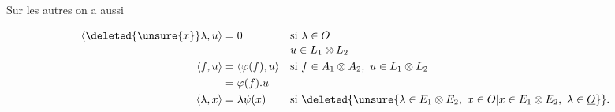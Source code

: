 \quad {}\quad{}

Sur les  autres on a aussi

\[
\begin{aligned}
 \langle\deleted{\unsure{x}}\lambda,u\rangle&=0 &&\text{si }\lambda\in O\\[-2pt]
 &&&u\in L_1\otimes L_2\\
 \langle f,u\rangle&=\langle\varphi(f),u\rangle &&\text{si } f\in A_1\otimes A_2,\ u\in L_1\otimes L_2\\
 &=\varphi(f).u\\
 \langle\lambda,x\rangle&=\lambda\psi(x) &&\text{si }\deleted{\unsure{\lambda\in E_1\otimes E_2,\ x\in O|x\in E_1\otimes E_2,\ \lambda\in\underline O}}.
\end{aligned}
\]

